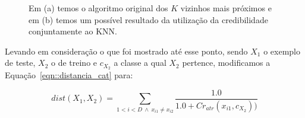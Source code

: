 \begin{figure}[ht]
\centering
{}
\caption{Em (a) temos o algoritmo original dos $K$ vizinhos mais próximos e em (b) temos um possível resultado da utilização da credibilidade conjuntamente ao \textsc{KNN}.
\label{fig::KNNantesedepois}}
\end{figure}

Levando em consideração o que foi mostrado até esse ponto, sendo $X_1$ o exemplo de teste, $X_2$ o de treino e $c_{X_2}$ a classe a qual $X_2$ pertence, modificamos a Equação~\ref{eqn::distancia_cat} para:

\begin{equation} \label{eqn::distancia_cat_cred}
   dist(X_1, X_2) = \sum_{1 < i < D\ \wedge \ x_{i1} \neq x_{i2}} \frac{1.0}{1.0 + Cr_{atr}(x_{i1}, c_{X_2} ))}
\end{equation}

